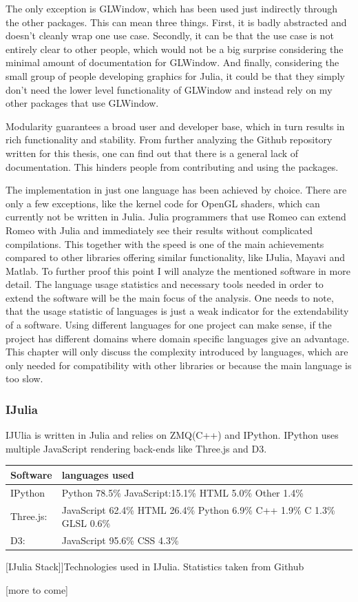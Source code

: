The only exception is GLWindow, which has been used just indirectly through the other packages. 
This can mean three things.
First, it is badly abstracted and doesn't cleanly wrap one use case.
Secondly, it can be that the use case is not entirely clear to other people, which would not be a big surprise considering the minimal amount of documentation for GLWindow.
And finally, considering the small group of people developing graphics for Julia, it could be that they simply don't need the lower level functionality of GLWindow and instead rely on my other packages that use GLWindow.

Modularity guarantees a broad user and developer base, which in turn results in rich functionality and stability.
From further analyzing the Github repository written for this thesis, one can find out that there is a general lack of documentation.
This hinders people from contributing and using the packages.

The implementation in just one language has been achieved by choice. There are only a few exceptions, like the kernel code for OpenGL shaders, which can currently not be written in Julia. 
Julia programmers that use Romeo can extend Romeo with Julia and immediately see their results without complicated compilations.
This together with the speed is one of the main achievements compared to other libraries offering similar functionality, like IJulia, Mayavi and Matlab.
To further proof this point I will analyze the mentioned software in more detail.
The language usage statistics and necessary tools needed in order to extend the software will be the main focus of the analysis.
One needs to note, that the usage statistic of languages is just a weak indicator for the extendability of a software.
Using different languages for one project can make sense, if the project has different domains where domain specific languages give an advantage.
This chapter will only discuss the complexity introduced by languages, which are only needed for compatibility with other libraries or because the main language is too slow.

\subsubsection{IJulia}

IJUlia is written in Julia and relies on ZMQ(C++) and IPython. 
IPython uses multiple JavaScript rendering back-ends like Three.js and D3.
\begin{table}[htbp]
    \centering
    \begin{tabular}{l|l}
        \hline
        \textbf{Software} & \textbf{languages used}\\
        \hline
        IPython     & Python 78.5\% JavaScript:15.1\% HTML 5.0\% Other 1.4\%\\
        Three.js:   & JavaScript 62.4\% HTML 26.4\% Python 6.9\% C++ 1.9\% C 1.3\% GLSL 0.6\%\\
        D3:         & JavaScript 95.6\% CSS 4.3\%\\
        \hline
        \end{tabular}
    [IJulia Stack]]{Technologies used in IJulia. Statistics taken from Github}
    \label{table:ijuliastack}
\end{table}
[more to come]
